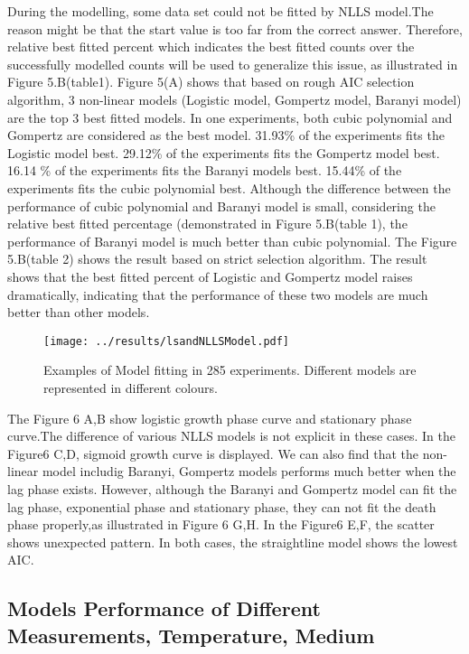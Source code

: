 \documentclass[11pt]{article}
\begin{document}
  During the modelling, some data set could not be fitted by NLLS model.The reason might be that the start value is too far from the correct answer. Therefore, relative best fitted percent which indicates the best fitted counts over the successfully modelled counts will be used to generalize this issue, as illustrated in Figure 5.B(table1). Figure 5(A) shows that based on rough AIC selection algorithm, 3 non-linear models (Logistic model, Gompertz model, Baranyi model) are the top 3 best fitted models. In one experiments, both cubic polynomial and Gompertz are considered as the best model. 31.93\% of the experiments fits the Logistic model best. 29.12\% of the experiments fits the Gompertz model best. 16.14 \% of the experiments fits the Baranyi models best. 15.44\% of the experiments fits the cubic polynomial best. Although the difference between the performance of cubic polynomial and Baranyi model is small, considering the relative best fitted percentage (demonstrated in Figure 5.B(table 1), the performance of Baranyi model is much better than cubic polynomial. The Figure 5.B(table 2) shows the result based on strict selection algorithm. The result shows that the best fitted percent of Logistic and Gompertz model raises dramatically, indicating that the performance of these two models are much better than other models.
  
      
  \begin{figure}[H]
        \centering
        \texttt{[image: ../results/lsandNLLSModel.pdf]}
        \caption{Examples of Model fitting in 285 experiments. Different models are represented in different colours.}
      \end{figure}
  
  The Figure 6 A,B show logistic growth phase curve and stationary phase curve.The difference of various NLLS models is not explicit in these cases. In the Figure6 C,D, sigmoid growth curve is displayed. We can also find that the non-linear model includig Baranyi, Gompertz models performs much better when the lag phase exists. However, although the Baranyi and Gompertz model can fit the lag phase, exponential phase and stationary phase, they can not fit the death phase properly,as illustrated in Figure 6 G,H. In the Figure6 E,F, the scatter shows unexpected pattern. In both cases, the straightline model shows the lowest AIC. 
  
  \subsection{Models Performance of Different Measurements, Temperature, Medium }
  
\end{document}
